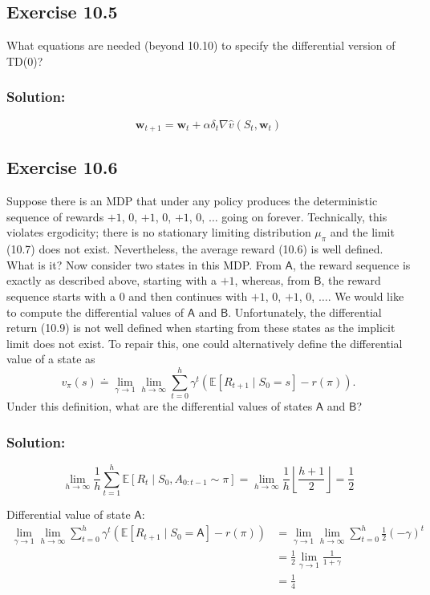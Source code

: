 \subsection*{Exercise 10.5}
What equations are needed (beyond 10.10) to specify the differential version of TD(0)?

\subsubsection*{Solution:}

\[
    \mathbf{w}_{t+1} = \mathbf{w}_t + \alpha \delta_t \nabla \hat{v}(S_t, \mathbf{w}_t)
\]

\subsection*{Exercise 10.6}

Suppose there is an MDP that under any policy produces the deterministic
sequence of rewards $+1$, $0$, $+1$, $0$, $+1$, $0$, $\dots$ going on forever. Technically, this violates
ergodicity; there is no stationary limiting distribution $\mu_\pi$ and the limit (10.7) does not
exist. Nevertheless, the average reward (10.6) is well defined. What is it? Now consider
two states in this MDP. From $\mathsf{A}$, the reward sequence is exactly as described above,
starting with a $+1$, whereas, from $\mathsf{B}$, the reward sequence starts with a $0$ and then
continues with $+1$, $0$, $+1$, $0$, $\dots$. We would like to compute the differential values of $\mathsf{A}$ and
$\mathsf{B}$. Unfortunately, the differential return (10.9) is not well defined when starting from
these states as the implicit limit does not exist. To repair this, one could alternatively
define the differential value of a state as
\[
    v_\pi(s) \doteq \lim_{\gamma \rightarrow 1} \lim_{h \rightarrow \infty} \sum_{t=0}^{h} \gamma^t \left( \mathbb{E} \left[ R_{t+1} \mid S_0 = s \right] - r(\pi) \right).
\]
Under this definition, what are the differential values of states $\mathsf{A}$ and $\mathsf{B}$?

\subsubsection*{Solution:}
\[
    \lim_{h \rightarrow \infty} \frac{1}{h} \sum_{t=1}^{h} \mathbb{E} \left[ R_{t} \mid S_0, A_{0:t-1} \sim  \pi \right] = \lim_{h \rightarrow \infty} \frac{1}{h}  \left\lfloor \frac{h+1}{2} \right\rfloor = \frac{1}{2}
\]

Differential value of state $\mathsf{A}$:
\begin{align*}
    \lim_{\gamma \rightarrow 1} \lim_{h \rightarrow \infty} \sum_{t=0}^{h} \gamma^t \left( \mathbb{E} \left[ R_{t+1} \mid S_0 = \mathsf{A} \right] - r(\pi) \right) &=  \lim_{\gamma \rightarrow 1} \lim_{h \rightarrow \infty} \sum_{t=0}^{h} \frac{1}{2}\left(-\gamma\right)^t \\
    &= \frac{1}{2}\lim_{\gamma \rightarrow 1} \frac{1}{1 + \gamma} \\
    &= \frac{1}{4}
\end{align*}

